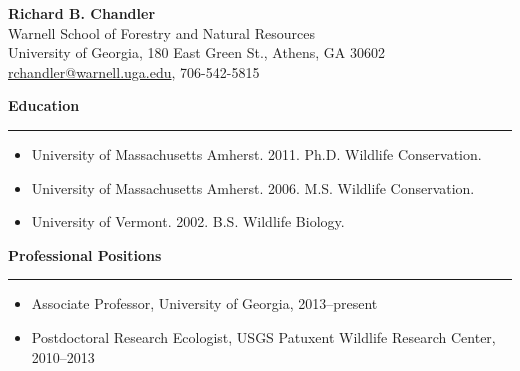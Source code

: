 \singlespacing
\thispagestyle{plain} %

\begin{center}
{\large \bf Richard B. Chandler} \\
Warnell School of Forestry and Natural Resources \\ %
University of Georgia, %
180 East Green St., Athens, GA 30602 \\
\href{mailto:rchandler@warnell.uga.edu}{rchandler@warnell.uga.edu},  %
706-542-5815 \\
\end{center}


\vspace{0.8cm}

{\large \bf Education} \\
\rule[3mm]{\textwidth}{0.3mm}

\begin{itemize}
    \item \textnormal{University of Massachusetts Amherst}. 2011. Ph.D. Wildlife Conservation. 
    \item \textnormal{University of Massachusetts Amherst}. 2006. M.S. Wildlife Conservation. 
    \item \textnormal{University of Vermont}. 2002. B.S. Wildlife Biology. 
\end{itemize}


\vspace{0.5cm}

{\large \bf Professional Positions} \\
\rule[3mm]{\textwidth}{0.3mm}

\begin{itemize}

\item \textnormal{Associate Professor}, %
  University of Georgia, 2013--present

\item \textnormal{Postdoctoral Research Ecologist}, USGS Patuxent
  Wildlife Research Center, 2010--2013

\end{itemize}


\vspace{0.5cm}

